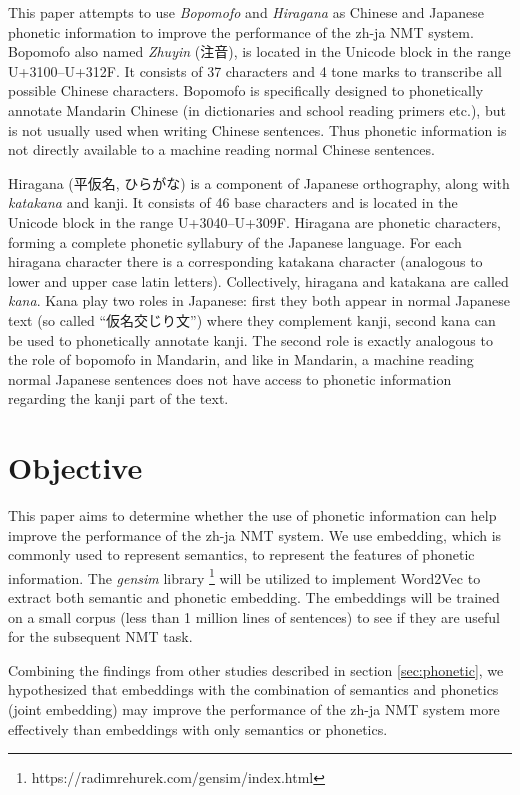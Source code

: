 This paper attempts to use \textit{Bopomofo} and \textit{Hiragana} as Chinese and Japanese phonetic information to improve the performance of the zh-ja NMT system. Bopomofo also named \textit{Zhuyin} (注音), is located in the Unicode block in the range U+3100–U+312F. It consists of 37 characters and 4 tone marks to transcribe all possible Chinese characters. Bopomofo is specifically designed to phonetically annotate Mandarin Chinese (in dictionaries and school reading primers etc.), but is not usually used when writing Chinese sentences.  Thus phonetic information is not directly available to a machine reading normal Chinese sentences.
\begin{CJK}{UTF8}{ipxm}
Hiragana (平仮名, ひらがな) is a component of Japanese orthography, along with \textit{katakana} and kanji. It consists of 46 base characters and is located in the Unicode block in the range U+3040–U+309F.  Hiragana are phonetic characters, forming a complete phonetic syllabury of the Japanese language.  For each hiragana character there is a corresponding katakana character (analogous to lower and upper case latin letters).  Collectively, hiragana and katakana are called \textit{kana}.  Kana play two roles in Japanese: first they both appear in normal Japanese text (so called ``仮名交じり文'') where they complement kanji, second kana can be used to phonetically annotate kanji.  The second role is exactly analogous to the role of bopomofo in Mandarin, and like in Mandarin, a machine reading normal Japanese sentences does not have access to phonetic information regarding the kanji part of the text.
\end{CJK}


\section{Objective} \label{sec:objective}

This paper aims to determine whether the use of phonetic information can help improve the performance of the zh-ja NMT system. We use embedding, which is commonly used to represent semantics, to represent the features of phonetic information. The \textit{gensim} library \footnote{https://radimrehurek.com/gensim/index.html} will be utilized to implement Word2Vec \cite{mikolov2013efficient} to extract both semantic and phonetic embedding. The embeddings will be trained on a small corpus (less than 1 million lines of sentences) to see if they are useful for the subsequent NMT task.

Combining the findings from other studies \cite{liu-etal-2019-robust, khan2019diversity} described in section \ref{sec:phonetic}, we hypothesized that embeddings with the combination of semantics and phonetics (joint embedding) may improve the performance of the zh-ja NMT system more effectively than embeddings with only semantics or phonetics. 

